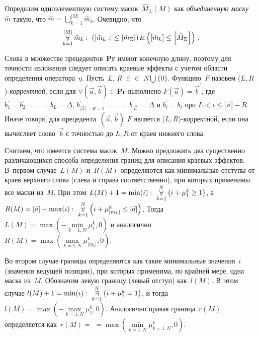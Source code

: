 \begin{multicols}{2}
Определим одноэлементную систему 
масок~$\hat{M}_\Sigma (M)$ как \textit{объединенную маску}~$\hat{m}$ такую, 
что $\hat{m} = \bigcup\limits_{k=1}^{\vert M\vert}\hat{m}_k$. Очевидно, что
\begin{equation*}
\mathop{\forall}\limits_{k=1}^{\vert M\vert} \hat{m}_k:\ \left (\left | \hat{m}_k:\right | \leq 
\left | \hat{m}_\Sigma\right |\right)\&\left(\left [ \hat{m}_k\right]\leq \left [ 
\hat{M}_\Sigma\right]\right )\,.
\end{equation*}

Слова в множестве прецедентов~\textbf{Pr} имеют конечную длину, поэтому 
для точности изложения следует описать краевые эффекты с учетом области 
определения оператора~$\eta$. Пусть~$L$, $R\;\in$\linebreak $\in\;N\bigcup\{0\}$. Функцию~$F$ 
назовем ($L, R$)-\textit{корректной}, если для $\forall 
\left(\vec{a},\vec{b}\right)\in\mathbf{Pr}$ выполнено 
$F\left (\vec{a}\right)=\vec{b}^\prime$, где $b_1^\prime =b_2^\prime =\ldots = 
b_L^\prime =\Delta$, $b^\prime_{\vert \vec{a}\vert -R+1}=\ldots = 
b^\prime_{\vert\vec{a}\vert}=\Delta$ и $b_i^\prime = b_i$ при $L<i\leq \left 
|\vec{a}\right |-R$. Иначе говоря, для прецедента~$\left(\vec{a},\vec{b}\right)$ 
$F$ является ($L, R$)-корректной, если она вычисляет слово~$\vec{b}$ с 
точностью до $L, R$ от краев нижнего слова.

Считаем, что имеется система масок~$M$. Можно предложить два 
существенно различающихся способа определения границ для описания 
краевых эффектов. В~первом случае~$L(M)$ и~$R(M)$ определяются как 
минимальные отступы от краев верхнего слова (слева и справа соответственно), 
при которых применимы все маски из~$M$. При этом $L(M) + 1 = \min (i) :\ 
\forallb\limits_{k=1}^N\left( i+\mu_1^k\geq 1\right)$, а $R(M) = \left | \vec{a}\right | 
-\max (i):\ \mathop{\forall}\limits_{k=1}^N \left(i+\mu^k_{\vert m_k\vert}\leq \left 
|\vec{a}\right |\right )$. Тогда $L(M) = \max\left(-\underset{k=1,N}{\min}\mu_1^k, 
0\right)$ и аналогично $R(M) = \max\left ( \underset{k=1,N}{\max} \mu^k_{\vert 
m_k\vert},0\right)$.

    Во втором случае границы определяются как такие минимальные 
значения~$i$ (значения ведущей позиции), при которых применима, по крайней 
мере, одна маска из~$M$. Обозначим левую границу (левый отступ) 
как~$l(M)$. В~этом случае $l(M) + 1 = \min (i):\ \mathop{\exists}\limits_{k=1}^N 
\left(i+\mu_1^k=1\right)$, и тогда $l(M)  = \max \left ( -\underset{k=1,N}{\max} 
\mu_1^k,0\right)$. Аналогично правая граница~$r(M)$ определяется как~$r(M)=$\linebreak 
$=\max \left (\underset{k=1,N}{\min} \mu^k_{k=1,N},0\right)$.


\end{multicols}
